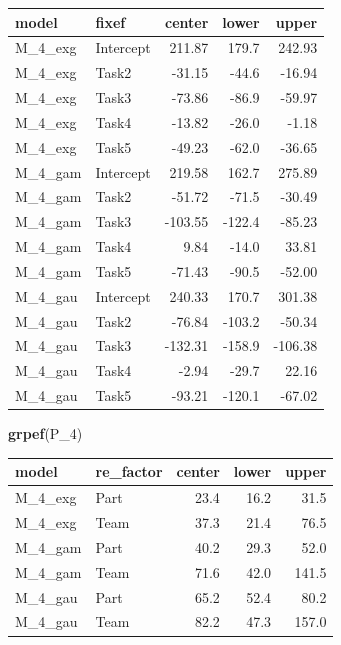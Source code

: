 \documentclass[]{svmono}
\newenvironment{Shaded}{\begin{snugshade}}{\end{snugshade}}
\newcommand{\KeywordTok}[1]{\textcolor[rgb]{0.13,0.29,0.53}{\textbf{#1}}}
\newcommand{\DataTypeTok}[1]{\textcolor[rgb]{0.13,0.29,0.53}{#1}}
\newcommand{\DecValTok}[1]{\textcolor[rgb]{0.00,0.00,0.81}{#1}}
\newcommand{\StringTok}[1]{\textcolor[rgb]{0.31,0.60,0.02}{#1}}
\newcommand{\OperatorTok}[1]{\textcolor[rgb]{0.81,0.36,0.00}{\textbf{#1}}}
\newcommand{\NormalTok}[1]{#1}
\theoremstyle{definition}
\theoremstyle{definition}
\theoremstyle{definition}
\theoremstyle{remark}
\begin{document}
\begin{longtable}[]{@{}llrrr@{}}
\toprule
model & fixef & center & lower & upper\tabularnewline
\midrule
\endhead
M\_4\_exg & Intercept & 211.87 & 179.7 & 242.93\tabularnewline
M\_4\_exg & Task2 & -31.15 & -44.6 & -16.94\tabularnewline
M\_4\_exg & Task3 & -73.86 & -86.9 & -59.97\tabularnewline
M\_4\_exg & Task4 & -13.82 & -26.0 & -1.18\tabularnewline
M\_4\_exg & Task5 & -49.23 & -62.0 & -36.65\tabularnewline
M\_4\_gam & Intercept & 219.58 & 162.7 & 275.89\tabularnewline
M\_4\_gam & Task2 & -51.72 & -71.5 & -30.49\tabularnewline
M\_4\_gam & Task3 & -103.55 & -122.4 & -85.23\tabularnewline
M\_4\_gam & Task4 & 9.84 & -14.0 & 33.81\tabularnewline
M\_4\_gam & Task5 & -71.43 & -90.5 & -52.00\tabularnewline
M\_4\_gau & Intercept & 240.33 & 170.7 & 301.38\tabularnewline
M\_4\_gau & Task2 & -76.84 & -103.2 & -50.34\tabularnewline
M\_4\_gau & Task3 & -132.31 & -158.9 & -106.38\tabularnewline
M\_4\_gau & Task4 & -2.94 & -29.7 & 22.16\tabularnewline
M\_4\_gau & Task5 & -93.21 & -120.1 & -67.02\tabularnewline
\bottomrule
\end{longtable}

\begin{Shaded}
\begin{Highlighting}[]
\KeywordTok{grpef}\NormalTok{(P_}\DecValTok{4}\NormalTok{)  }
\end{Highlighting}
\end{Shaded}

\begin{longtable}[]{@{}llrrr@{}}
\toprule
model & re\_factor & center & lower & upper\tabularnewline
\midrule
\endhead
M\_4\_exg & Part & 23.4 & 16.2 & 31.5\tabularnewline
M\_4\_exg & Team & 37.3 & 21.4 & 76.5\tabularnewline
M\_4\_gam & Part & 40.2 & 29.3 & 52.0\tabularnewline
M\_4\_gam & Team & 71.6 & 42.0 & 141.5\tabularnewline
M\_4\_gau & Part & 65.2 & 52.4 & 80.2\tabularnewline
M\_4\_gau & Team & 82.2 & 47.3 & 157.0\tabularnewline
\bottomrule
\end{longtable}

\begin{Shaded}
\end{Shaded}
\end{document}
